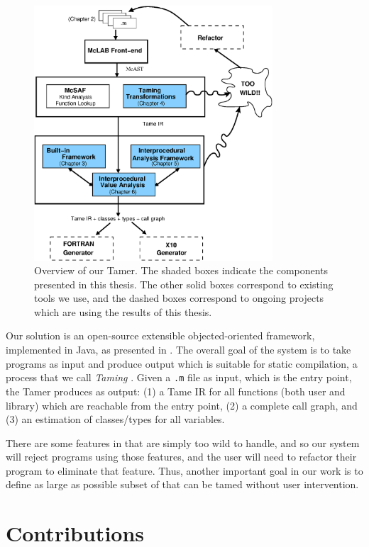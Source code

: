\begin{figure}[htbp]
\begin{center}
\includegraphics[width=3.5in]{Figures/overview.eps}
\caption[Overview of the \matlab Tamer]{Overview
of our \matlab Tamer.  The shaded boxes indicate the components
presented in this thesis.  The other solid boxes correspond to
existing \mclab tools we use, and the dashed boxes correspond to
ongoing projects which are using the results of this
thesis.}\label{Fig:Overview}
\end{center}
\end{figure}

Our solution is an open-source extensible objected-oriented framework,
implemented in Java, as presented in .   The overall
goal of the system is to take \matlab programs as input and produce output
which is suitable for static compilation, a process that we call
\textit{Taming} \matlab.   Given a \texttt{.m} file as input, which is the
entry point, the \matlab Tamer produces as output: (1) a Tame
IR  for all functions (both user
and library) which are reachable from the entry point, (2) a complete
call graph, and (3) an estimation of classes/types for all variables.

There are some features in \matlab that are simply too wild to handle, and so
our system will reject programs using those features, and the user will need to
refactor their program to eliminate that feature.   Thus, another important
goal in our work is to define as large as possible subset of \matlab that can
be tamed without user intervention. 

\section{Contributions}

